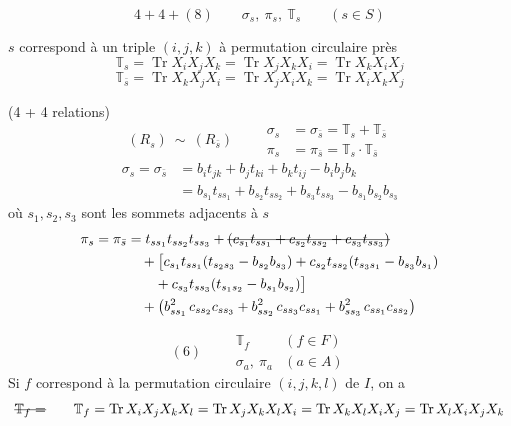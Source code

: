 \documentclass[11pt,a4paper]{article}
\begin{document}
\[
4 + 4 + (8)\qquad
\boxed{\sigma_s,\ \pi_s,\ \mathbb{T}_s}\qquad (s\in S)
\]

$s$ correspond à un triple $(i,j,k)$ à permutation circulaire près
\[
\mathbb{T}_s = \operatorname{Tr} X_i X_j X_k = \operatorname{Tr} X_j X_k X_i = \operatorname{Tr} X_k X_i X_j
\]
\[
\mathbb{T}_{\bar s} = \operatorname{Tr} X_k X_j X_i = \operatorname{Tr} X_j X_i X_k = \operatorname{Tr} X_i X_k X_j
\]

(4 + 4 relations)
\[
(R_s)\ \sim\ (R_{\bar s})\qquad
\boxed{\begin{aligned}
\sigma_s &= \sigma_{\bar s} = \mathbb{T}_s + \mathbb{T}_{\bar s}\\
\pi_s &= \pi_{\bar s} = \mathbb{T}_s \cdot \mathbb{T}_{\bar s}
\end{aligned}}
\]
\begin{align*}
\sigma_s = \sigma_{\bar s} &= b_i t_{jk} + b_j t_{ki} + b_k t_{ij} - b_i b_j b_k\\
&= b_{s_1} t_{ss_1} + b_{s_2} t_{ss_2} + b_{s_3} t_{ss_3} - b_{s_1} b_{s_2} b_{s_3}
\end{align*}
où $s_1, s_2, s_3$ sont les sommets adjacents à $s$
\begin{align*}
\pi_s = \pi_{\bar s} &= t_{ss_1} t_{ss_2} t_{ss_3}
+ \text{\struck{$(c_{s_1} t_{ss_1} + c_{s_2} t_{ss_2} + c_{s_3} t_{ss_3})$}}\\
&\quad + \bigl[c_{s_1} t_{ss_1}(t_{s_2 s_3} - b_{s_2} b_{s_3}) + c_{s_2} t_{ss_2}(t_{s_3 s_1} - b_{s_3} b_{s_1})\\
&\qquad + c_{s_3} t_{ss_3}(t_{s_1 s_2} - b_{s_1} b_{s_2})\bigr]\\
&\quad + \bigl(b_{ss_1}^2\, c_{ss_2} c_{ss_3} + b_{ss_2}^2\, c_{ss_3} c_{ss_1} + b_{ss_3}^2\, c_{ss_1} c_{ss_2}\bigr)
\end{align*}

\[
(6)\qquad
\boxed{\begin{array}{ll} \mathbb{T}_f & (f\in F)\\ \sigma_a,\ \pi_a & (a\in A)\end{array}}
\]
Si $f$ correspond à la permutation circulaire $(i,j,k,l)$ de $I$, on a
\[
\text{\struck{$\mathbb{T}_f =$}}\qquad
\mathbb{T}_f = \operatorname{Tr} X_i X_j X_k X_l = \operatorname{Tr} X_j X_k X_l X_i = \operatorname{Tr} X_k X_l X_i X_j = \operatorname{Tr} X_l X_i X_j X_k
\]
\end{document}
